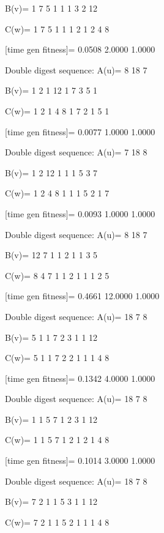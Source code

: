 B(v)=
     1     7     5     1     1     1     3     2    12

C(w)=
     1     7     5     1     1     1     2     1     2     4     8

[time gen fitness]=
    0.0508    2.0000    1.0000

Double digest sequence:
A(u)=
     8    18     7

B(v)=
     1     2     1    12     1     7     3     5     1

C(w)=
     1     2     1     4     8     1     7     2     1     5     1

[time gen fitness]=
    0.0077    1.0000    1.0000

Double digest sequence:
A(u)=
     7    18     8

B(v)=
     1     2    12     1     1     1     5     3     7

C(w)=
     1     2     4     8     1     1     1     5     2     1     7

[time gen fitness]=
    0.0093    1.0000    1.0000

Double digest sequence:
A(u)=
     8    18     7

B(v)=
    12     7     1     1     2     1     1     3     5

C(w)=
     8     4     7     1     1     2     1     1     1     2     5

[time gen fitness]=
    0.4661   12.0000    1.0000

Double digest sequence:
A(u)=
    18     7     8

B(v)=
     5     1     1     7     2     3     1     1    12

C(w)=
     5     1     1     7     2     2     1     1     1     4     8

[time gen fitness]=
    0.1342    4.0000    1.0000

Double digest sequence:
A(u)=
    18     7     8

B(v)=
     1     1     5     7     1     2     3     1    12

C(w)=
     1     1     5     7     1     2     1     2     1     4     8

[time gen fitness]=
    0.1014    3.0000    1.0000

Double digest sequence:
A(u)=
    18     7     8

B(v)=
     7     2     1     1     5     3     1     1    12

C(w)=
     7     2     1     1     5     2     1     1     1     4     8

